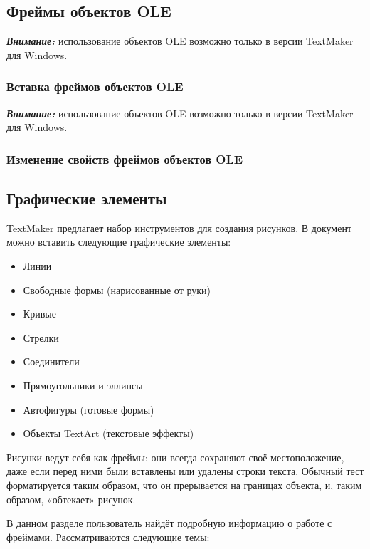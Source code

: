 ﻿\documentclass[a4paper,10pt]{article}
\begin{document}
\subsection{Фреймы объектов OLE}
\begin{mdframed}[backgroundcolor=blue!10]
\textbf{\textit{Внимание:}} использование объектов OLE возможно только в версии TextMaker для Windows.
\end{mdframed}



\subsubsection{Вставка фреймов объектов OLE}
\begin{mdframed}[backgroundcolor=blue!10]
\textbf{\textit{Внимание:}} использование объектов OLE возможно только в версии TextMaker для Windows.
\end{mdframed}

\subsubsection{Изменение свойств фреймов объектов OLE}
\subsection{Графические элементы}
TextMaker предлагает набор инструментов для создания рисунков. В документ можно вставить следующие графические элементы:
\begin{itemize}
 \item Линии
 \item Свободные формы (нарисованные от руки)
 \item Кривые
 \item Стрелки
 \item Соединители
 \item Прямоугольники и эллипсы
 \item Автофигуры (готовые формы)
 \item Объекты TextArt (текстовые эффекты)
\end{itemize}

Рисунки ведут себя как фреймы: они всегда сохраняют своё местоположение, даже если перед ними были вставлены или удалены строки текста. Обычный тест форматируется таким образом, что он прерывается на границах объекта, и, таким образом, «обтекает» рисунок.

В данном разделе пользователь найдёт подробную информацию о работе с фреймами. Рассматриваются следующие темы:
\end{document}
